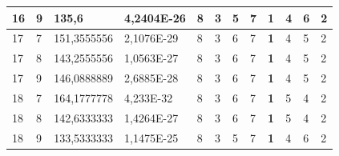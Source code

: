 \documentclass[conference]{IEEEtran}
\begin{document}
\begin{table}[]
\begin{tabular}{|llll|llllllll|}
		\multicolumn{1}{|l|}{16}  & \multicolumn{1}{l|}{9}         & \multicolumn{1}{l|}{135,6}         & 4,2404E-26 & \multicolumn{1}{l|}{8}   & \multicolumn{1}{l|}{3}   & \multicolumn{1}{l|}{5}   & \multicolumn{1}{l|}{7}   & \multicolumn{1}{l|}{\textbf{1}} & \multicolumn{1}{l|}{4}   & \multicolumn{1}{l|}{6}   & 2                      \\ \hline
		\multicolumn{1}{|l|}{17}  & \multicolumn{1}{l|}{7}         & \multicolumn{1}{l|}{151,3555556}   & 2,1076E-29 & \multicolumn{1}{l|}{8}   & \multicolumn{1}{l|}{3}   & \multicolumn{1}{l|}{6}   & \multicolumn{1}{l|}{7}   & \multicolumn{1}{l|}{\textbf{1}} & \multicolumn{1}{l|}{4}   & \multicolumn{1}{l|}{5}   & 2                      \\ \hline
		\multicolumn{1}{|l|}{17}  & \multicolumn{1}{l|}{8}         & \multicolumn{1}{l|}{143,2555556}   & 1,0563E-27 & \multicolumn{1}{l|}{8}   & \multicolumn{1}{l|}{3}   & \multicolumn{1}{l|}{6}   & \multicolumn{1}{l|}{7}   & \multicolumn{1}{l|}{\textbf{1}} & \multicolumn{1}{l|}{4}   & \multicolumn{1}{l|}{5}   & 2                      \\ \hline
		\multicolumn{1}{|l|}{17}  & \multicolumn{1}{l|}{9}         & \multicolumn{1}{l|}{146,0888889}   & 2,6885E-28 & \multicolumn{1}{l|}{8}   & \multicolumn{1}{l|}{3}   & \multicolumn{1}{l|}{6}   & \multicolumn{1}{l|}{7}   & \multicolumn{1}{l|}{\textbf{1}} & \multicolumn{1}{l|}{4}   & \multicolumn{1}{l|}{5}   & 2                      \\ \hline
		\multicolumn{1}{|l|}{18}  & \multicolumn{1}{l|}{7}         & \multicolumn{1}{l|}{164,1777778}   & 4,233E-32  & \multicolumn{1}{l|}{8}   & \multicolumn{1}{l|}{3}   & \multicolumn{1}{l|}{6}   & \multicolumn{1}{l|}{7}   & \multicolumn{1}{l|}{\textbf{1}} & \multicolumn{1}{l|}{5}   & \multicolumn{1}{l|}{4}   & 2                      \\ \hline
		\multicolumn{1}{|l|}{18}  & \multicolumn{1}{l|}{8}         & \multicolumn{1}{l|}{142,6333333}   & 1,4264E-27 & \multicolumn{1}{l|}{8}   & \multicolumn{1}{l|}{3}   & \multicolumn{1}{l|}{6}   & \multicolumn{1}{l|}{7}   & \multicolumn{1}{l|}{\textbf{1}} & \multicolumn{1}{l|}{5}   & \multicolumn{1}{l|}{4}   & 2                      \\ \hline
		\multicolumn{1}{|l|}{18}  & \multicolumn{1}{l|}{9}         & \multicolumn{1}{l|}{133,5333333}   & 1,1475E-25 & \multicolumn{1}{l|}{8}   & \multicolumn{1}{l|}{3}   & \multicolumn{1}{l|}{5}   & \multicolumn{1}{l|}{7}   & \multicolumn{1}{l|}{\textbf{1}} & \multicolumn{1}{l|}{4}   & \multicolumn{1}{l|}{6}   & 2                      \\ \hline

\end{tabular}
\end{table}
\end{document}
